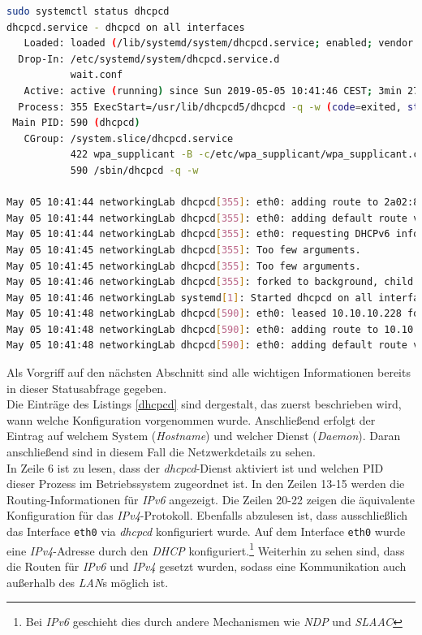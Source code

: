 \documentclass[paper=a4,fontsize=11pt]{scrartcl}%
\numberwithin{equation}{section}
\begin{document}
	\begin{lstlisting}[style=Bash, language=Bash, label=dhcpcd]
sudo systemctl status dhcpcd
dhcpcd.service - dhcpcd on all interfaces
   Loaded: loaded (/lib/systemd/system/dhcpcd.service; enabled; vendor preset: enabled)
  Drop-In: /etc/systemd/system/dhcpcd.service.d
           wait.conf
   Active: active (running) since Sun 2019-05-05 10:41:46 CEST; 3min 27s ago
  Process: 355 ExecStart=/usr/lib/dhcpcd5/dhcpcd -q -w (code=exited, status=0/SUCCESS)
 Main PID: 590 (dhcpcd)
   CGroup: /system.slice/dhcpcd.service
           422 wpa_supplicant -B -c/etc/wpa_supplicant/wpa_supplicant.conf -iwlan0 -Dnl80211,wext
           590 /sbin/dhcpcd -q -w
           
May 05 10:41:44 networkingLab dhcpcd[355]: eth0: adding route to 2a02:8109:83c0:371e::/64
May 05 10:41:44 networkingLab dhcpcd[355]: eth0: adding default route via fe80::e228:6dff:fe54:68bf
May 05 10:41:44 networkingLab dhcpcd[355]: eth0: requesting DHCPv6 information
May 05 10:41:45 networkingLab dhcpcd[355]: Too few arguments.
May 05 10:41:45 networkingLab dhcpcd[355]: Too few arguments.
May 05 10:41:46 networkingLab dhcpcd[355]: forked to background, child pid 590
May 05 10:41:46 networkingLab systemd[1]: Started dhcpcd on all interfaces.
May 05 10:41:48 networkingLab dhcpcd[590]: eth0: leased 10.10.10.228 for 864000 seconds
May 05 10:41:48 networkingLab dhcpcd[590]: eth0: adding route to 10.10.10.254/24
May 05 10:41:48 networkingLab dhcpcd[590]: eth0: adding default route via 10.10.10.254
\end{lstlisting}	
Als Vorgriff auf den nächsten Abschnitt sind alle wichtigen Informationen bereits in dieser Statusabfrage gegeben.\\
Die Einträge des Listings \ref{dhcpcd} sind dergestalt, das zuerst beschrieben wird, wann welche Konfiguration vorgenommen wurde. Anschließend erfolgt der Eintrag auf welchem System (\emph{Hostname}) und welcher Dienst (\emph{Daemon}). Daran anschließend sind in diesem Fall die Netzwerkdetails zu sehen.\\
In Zeile 6 ist zu lesen, dass der \emph{dhcpcd}-Dienst aktiviert ist und welchen \ac{PID} dieser Prozess im Betriebssystem zugeordnet ist. In den Zeilen 13-15 werden die Routing-Informationen für \emph{IPv6} angezeigt. Die Zeilen 20-22 zeigen die äquivalente Konfiguration für das \emph{IPv4}-Protokoll. Ebenfalls abzulesen ist, dass ausschließlich das Interface \texttt{eth0} via \emph{dhcpcd}	konfiguriert wurde. Auf dem Interface \texttt{eth0} wurde eine \emph{IPv4}-Adresse durch den \emph{DHCP} konfiguriert.\footnote{Bei \emph{IPv6} geschieht dies durch andere Mechanismen wie \emph{\ac{NDP}} und \emph{\ac{SLAAC}}} Weiterhin zu sehen sind, dass die Routen für \emph{IPv6} und \emph{IPv4} gesetzt wurden, sodass eine Kommunikation auch außerhalb des \emph{LAN}s möglich ist.
\end{document}
